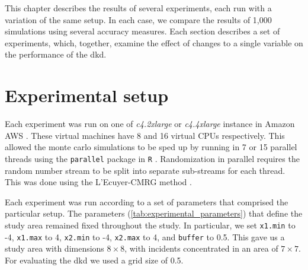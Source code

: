 

This chapter describes the results of several experiments, each run with a variation of the same setup.
In each case, we compare the results of 1,000 simulations using several accuracy measures.
Each section describes a set of experiments, which, together, examine the effect of changes to a single variable on the performance of the \gls{dkd}.

\section{Experimental setup}
\label{sec:results:setup}

Each experiment was run on one of \textit{c4.2xlarge} or \textit{c4.4xlarge} instance in Amazon AWS \citep{aws:instancetypes}.
These virtual machines have 8 and 16 virtual CPUs respectively.
This allowed the monte carlo simulations to be sped up by running in 7 or 15 parallel threads using the \texttt{parallel} package in \texttt{R} \citep{r:parallel}.
Randomization in parallel requires the random number stream to be split into separate sub-streams for each thread. 
This was done using the L'Ecuyer-CMRG method \citep{lecuyer2002random}.

Each experiment was run according to a set of parameters that comprised the particular setup.
The parameters (\cref{tab:experimental_parameters}) that define the study area remained fixed throughout the study.
In particular, we set \texttt{x1.min} to -4, \texttt{x1.max} to 4, \texttt{x2.min} to -4, \texttt{x2.max} to 4, and \texttt{buffer} to 0.5.
This gave us a study area with dimensions \(8 \times 8\), with incidents concentrated in an area of \(7 \times 7\).
For evaluating the \gls{dkd} we used a grid size of 0.5.

